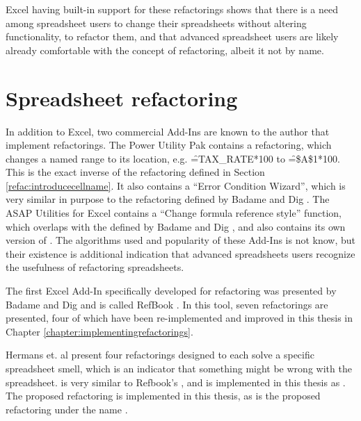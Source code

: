 Excel having built-in support for these refactorings shows that there is a need among spreadsheet users to change their spreadsheets without altering functionality, to refactor them, and that advanced spreadsheet users are likely already comfortable with the concept of refactoring, albeit it not by name.

\section{Spreadsheet refactoring}

In addition to Excel, two commercial Add-Ins are known to the author that implement refactorings.
The Power Utility Pak \cite{PuPv7} contains a  refactoring, which changes a named range to its location, e.g. \f{=TAX_RATE*100} to \f{=\$A\$1*100}.
This is the exact inverse of the  refactoring defined in Section \ref{refac:introducecellname}.
It also contains a ``Error Condition Wizard'', which is very similar in purpose to the  refactoring defined by Badame and Dig \cite{badame2012refactoring}.
The ASAP Utilities for Excel \cite{ASAP5} contains a ``Change formula reference style'' function, which overlaps with the  defined by Badame and Dig \cite{badame2012refactoring}, and also contains its own version of .
The algorithms used and popularity of these Add-Ins is not know, but their existence is additional indication that advanced spreadsheets users recognize the usefulness of refactoring spreadsheets.

The first Excel Add-In specifically developed for refactoring was presented by Badame and Dig and is called RefBook \cite{badame2012refactoring}.
In this tool, seven refactorings are presented, four of which have been re-implemented and improved in this thesis in Chapter \ref{chapter:implementingrefactorings}.

Hermans et. al \cite{hermans2014detecting} present four refactorings designed to each solve a specific spreadsheet smell, which is an indicator that something might be wrong with the spreadsheet.
 is very similar to Refbook's , and is implemented in this thesis as .
The proposed  refactoring is implemented in this thesis, as is the proposed  refactoring under the name .

